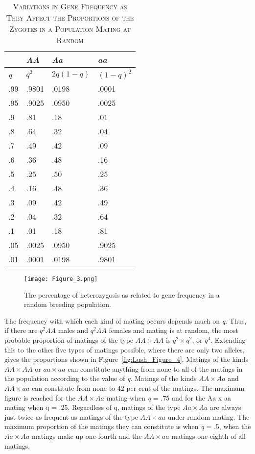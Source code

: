 \begin{table}[htbp]
	\centering
	\caption{\textsc{Variations in Gene Frequency as They Affect the Proportions of the Zygotes
			in a Population Mating at Random}}
	\label{tbl:Lush_Table_2}
	\begin{tabular}{C{2.5cm}|C{2.5cm}|C{2.5cm}|C{2.5cm}}
		\hline
		\hline
 						& \textit{AA}		& \textit{Aa}			& \textit{aa} \\
 		\hline
 		\textit{q}		& $q^2$				& $2q(1-q)$				& $(1-q)^2$ \\
 		\hline
		.99				& .9801				& .0198					& .0001 \\
		.95				& .9025				& .0950					& .0025 \\
		.9				& .81				& .18					& .01 \\
		.8				& .64				& .32					& .04 \\
		.7				& .49				& .42					& .09 \\
		.6				& .36				& .48					& .16 \\
		.5				& .25				& .50					& .25 \\
		.4				& .16				& .48					& .36 \\
		.3				& .09				& .42					& .49 \\
		.2				& .04				& .32					& .64 \\
		.1				& .01				& .18					& .81 \\
		.05				& .0025				& .0950					& .9025 \\
		.01				& .0001				& .0198					& .9801 \\
		\hline
	\end{tabular}
\end{table}

\begin{figure}[htbp]
    \texttt{[image: Figure\_3.png]}
    \caption{The percentage of heterozygosis as related to gene frequency in a random breeding population.}
    \label{fig:Lush_Figure_3}
\end{figure}

The frequency with which each kind of mating occurs depends much on \textit{q}. Thus, if there are
$q^{2}AA$ males and $q^{2}AA$ females and mating is at random, the most probable proportion of
matings of the type $AA \times AA$ is $q^2 \times q^2$, or $q^4$. Extending this to the other
five types of matings possible, where there are only two alleles, gives the proportions
shown in Figure~\ref{fig:Lush_Figure_4}. Matings of the kinds $AA \times AA$ or $aa \times aa$ can constitute
anything from none to all of the matings in the population according to the value of \textit{q}.
Matings of the kinds $AA \times Aa$ and $AA \times aa$ can constitute from none to 42 per cent
of the matings. The maximum figure is reached for the $AA \times Aa$ mating when \textit{q} = .75
and for the Aa x aa mating when q = .25. Regardless of q, matings of the type $Aa \times Aa$ are
always just twice as frequent as matings of the type $AA \times aa$ under random mating. The maximum
proportion of the matings they can constitute is when \textit{q} = .5, when the $Aa \times Aa$
matings make up one-fourth and the $AA \times aa$ matings one-eighth of all matings.

